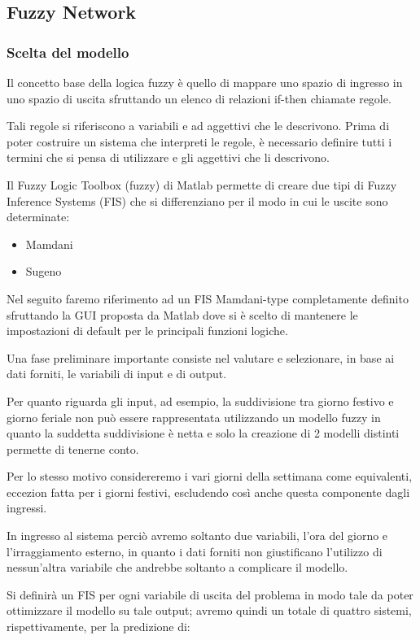 \subsection{Fuzzy Network}

\subsubsection{Scelta del modello}
Il concetto base della logica fuzzy è quello di mappare uno spazio di ingresso in uno spazio di uscita sfruttando un elenco di relazioni if-then chiamate regole.

Tali regole si riferiscono a variabili e ad aggettivi che le descrivono. Prima di poter costruire un sistema che interpreti le regole, è necessario definire tutti i termini che si pensa di utilizzare e gli aggettivi che li descrivono.

Il Fuzzy Logic Toolbox (fuzzy) di Matlab permette di creare due tipi di Fuzzy Inference Systems (FIS) che si differenziano per il modo in cui le uscite sono determinate:

\begin{itemize}
  \item Mamdani
  \item Sugeno
\end{itemize}

Nel seguito faremo riferimento ad un FIS Mamdani-type completamente definito sfruttando la GUI proposta da Matlab dove si è scelto di mantenere le impostazioni di default per le principali funzioni logiche.

Una fase preliminare importante consiste nel valutare e selezionare, in base ai dati forniti, le variabili di input e di output.

Per quanto riguarda gli input, ad esempio, la suddivisione tra giorno festivo e giorno feriale non può essere rappresentata utilizzando un modello fuzzy in quanto la suddetta suddivisione è netta e solo la creazione di 2 modelli distinti permette di tenerne conto.

Per lo stesso motivo considereremo i vari giorni della settimana come equivalenti, eccezion fatta per i giorni festivi, escludendo così anche questa componente dagli ingressi.

In ingresso al sistema perciò avremo soltanto due variabili, l’ora del giorno e l’irraggiamento esterno, in quanto i dati forniti non giustificano l’utilizzo di nessun’altra variabile che andrebbe soltanto a complicare il modello.

Si definirà un FIS per ogni variabile di uscita del problema in modo tale da poter ottimizzare il modello su tale output; avremo quindi un totale di quattro sistemi, rispettivamente, per la predizione di:

